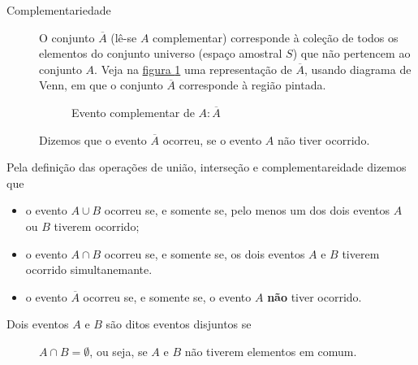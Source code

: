 \begin{description}
\item [{Complementariedade}]
O conjunto \(\overline{A}\) (lê-se \(A\) complementar) corresponde à coleção de todos os elementos do conjunto universo (espaço amostral \(S\)) que não pertencem ao conjunto \(A\). Veja na \hyperref[complementar]{figura \ref{complementar}} uma representação de \(\overline{A}\), usando diagrama de Venn, em que o conjunto \(\overline{A}\) corresponde à região pintada.

\begin{figure}[H]
\centering

\caption{Evento complementar de \(A: \overline{A}\)}
\label{complementar}
\end{figure}

Dizemos que o evento \(\overline{A}\) ocorreu, se o evento \(A\) não tiver ocorrido.
\end{description}

Pela definição das operações de união, interseção e complementareidade dizemos que
\begin{itemize}
\item {} 
o evento \(A\cup B\)  ocorreu se, e somente se, pelo menos um dos dois eventos \(A\) ou \(B\) tiverem ocorrido;

\item {} 
o evento \(A\cap B\) ocorreu se, e somente se, os dois eventos \(A\) e \(B\) tiverem ocorrido simultanemante.

\item {} 
o evento \(\overline{A}\) ocorreu se, e somente se, o evento \(A\) \textbf{não} tiver ocorrido.

\end{itemize}

\begin{description}
\item[{Dois eventos \(A\)  e \(B\) são ditos eventos disjuntos se}]
$A\cap B=\emptyset$, ou seja, se \(A\) e \(B\) não tiverem elementos em comum.
\end{description}

